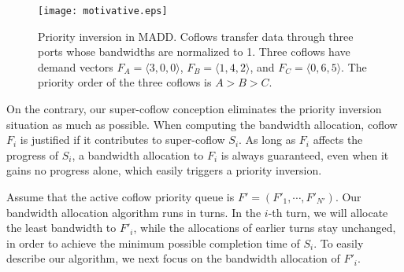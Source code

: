 \documentclass[10pt, conference, letterpaper]{IEEEtran}
\begin{document}
\begin{figure}[!t]
	\centering\texttt{[image: motivative.eps]}
	\caption{Priority inversion in MADD. Coflows transfer data through three ports whose bandwidths are normalized to 1. Three coflows have demand vectors $F_A=\langle 3,0,0\rangle$, $F_B=\langle 1,4,2\rangle$, and $F_C=\langle 0,6,5\rangle$. The priority order of the three coflows is $A > B > C$.}\label{motivative}
\end{figure}


On the contrary, our super-coflow conception eliminates the priority inversion situation as much as possible. When computing the bandwidth allocation, coflow $F_i$ is justified if it contributes to super-coflow $S_i$. As long as $F_i$ affects the progress of $S_i$, a bandwidth allocation to $F_i$ is always guaranteed, even when it gains no progress alone, which easily triggers a priority inversion.

Assume that the active coflow priority queue is $F'=(F'_1,\cdots,F'_{N'})$. Our bandwidth allocation algorithm runs in turns. In the $i$-th turn, we will allocate the least bandwidth to $F'_i$, while the allocations of earlier turns stay unchanged,  in order to achieve the minimum possible completion time of $S_i$. To easily describe our algorithm, we next focus on the bandwidth allocation of $F'_i$.
\end{document}
